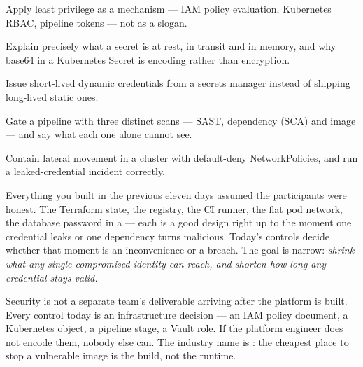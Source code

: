
\begin{objectives}
\begin{wbitem}
  \item Apply least privilege as a mechanism --- IAM policy evaluation, Kubernetes RBAC, pipeline tokens --- not as a slogan.
  \item Explain precisely what a secret is at rest, in transit and in memory, and why base64 in a Kubernetes Secret is encoding rather than encryption.
  \item Issue short-lived dynamic credentials from a secrets manager instead of shipping long-lived static ones.
  \item Gate a pipeline with three distinct scans --- SAST, dependency (SCA) and image --- and say what each one alone cannot see.
  \item Contain lateral movement in a cluster with default-deny NetworkPolicies, and run a leaked-credential incident correctly.
\end{wbitem}
\end{objectives}


 Everything you built in the previous eleven days assumed the participants were honest. The Terraform state, the registry, the CI runner, the flat pod network, the database password in a  --- each is a good design right up to the moment one credential leaks or one dependency turns malicious. Today's controls decide whether that moment is an inconvenience or a breach. The goal is narrow: \emph{shrink what any single compromised identity can reach, and shorten how long any credential stays valid.}

 Security is not a separate team's deliverable arriving after the platform is built. Every control today is an infrastructure decision --- an IAM policy document, a Kubernetes object, a pipeline stage, a Vault role. If the platform engineer does not encode them, nobody else can. The industry name is : the cheapest place to stop a vulnerable image is the build, not the runtime.

